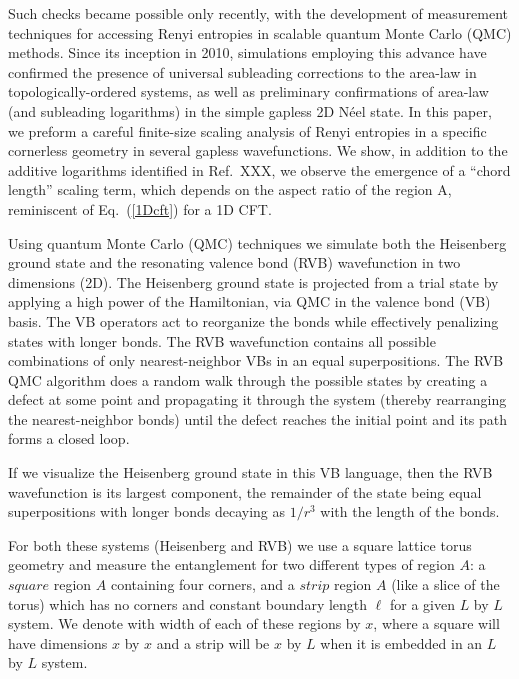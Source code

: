 \documentclass[prl,aps,twocolumn,floatfix,amsmath,amssymb,superscriptaddress,tightenlines]{revtex4}
\begin{document}
Such checks became possible only recently, with the development of measurement techniques for accessing Renyi entropies in scalable quantum Monte Carlo (QMC) methods.  Since its inception in 2010, simulations employing this advance have confirmed the presence of universal subleading corrections to the area-law in topologically-ordered systems, as well as preliminary confirmations of area-law (and subleading logarithms) in the simple gapless 2D N\'eel state.  In this paper, we preform a careful finite-size scaling analysis of Renyi entropies in a specific cornerless geometry in several gapless wavefunctions.  We show, in addition to the additive logarithms identified in Ref.~XXX, we observe the emergence of a ``chord length'' scaling term, which depends on the aspect ratio of the region A, reminiscent of Eq.~(\ref{1Dcft}) for a 1D CFT.

Using quantum Monte Carlo (QMC) techniques we simulate both the Heisenberg ground state and the resonating valence bond (RVB) wavefunction in two dimensions (2D). 
The Heisenberg ground state is projected from a trial state by applying a high power of the Hamiltonian, via QMC in the valence bond (VB) basis.\cite{Sandvik_VBQMC}
The VB operators act to reorganize the bonds while effectively penalizing states with longer bonds.
The RVB wavefunction contains all possible combinations of only nearest-neighbor VBs in an equal superpositions.
The RVB QMC algorithm does a random walk through the possible states by creating a defect at some point and propagating it through the system (thereby rearranging the nearest-neighbor bonds) until the defect reaches the initial point and its path forms a closed loop.

If we visualize the Heisenberg ground state in this VB language, then the RVB wavefunction is its largest component, the remainder of the state being equal superpositions with longer bonds decaying as $1/r^3$ \cite{Sandvik_VB_decay} with the length of the bonds.

For both these systems (Heisenberg and RVB) we use a square lattice torus geometry and measure the entanglement for two different types of region $A$:
a $square$ region $A$ containing four corners, and a $strip$ region $A$ (like a slice of the torus) which has no corners and constant boundary length $\ell$ for a given $L$ by $L$ system.
We denote with width of each of these regions by $x$, where a square will have dimensions $x$ by $x$ and a strip will be $x$ by $L$ when it is embedded in an $L$ by $L$ system.
\end{document}
